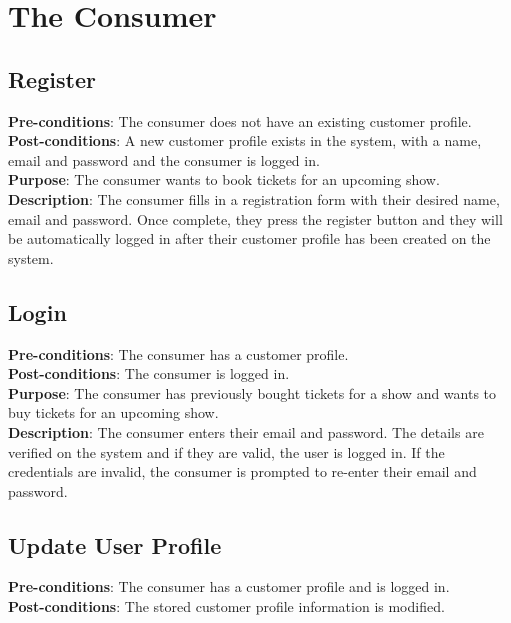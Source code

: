 \section{The Consumer}

\subsection{Register}
\textbf{Pre-conditions}: The consumer does not have an existing
customer profile.\\

\textbf{Post-conditions}: A new customer profile exists in the
system, with a name, email and password and the consumer is logged
in.\\

\textbf{Purpose}: The consumer wants to book tickets for an
upcoming show.\\

\textbf{Description}: The consumer fills in a registration form with
their desired name, email and password. Once complete, they press
the register button and they will be automatically logged in after
their customer profile has been created on the system.

\subsection{Login}
\textbf{Pre-conditions}: The consumer has a customer profile.\\

\textbf{Post-conditions}: The consumer is logged in.\\

\textbf{Purpose}: The consumer has previously bought tickets for a
show and wants to buy tickets for an upcoming show.\\

\textbf{Description}: The consumer enters their email and password.
The details are verified on the system and if they are valid, the
user is logged in. If the credentials are invalid, the consumer is
prompted to re-enter their email and password.

\subsection{Update User Profile}
\textbf{Pre-conditions}: The consumer has a customer profile and is
logged in.\\

\textbf{Post-conditions}: The stored customer profile information is
modified.\\

